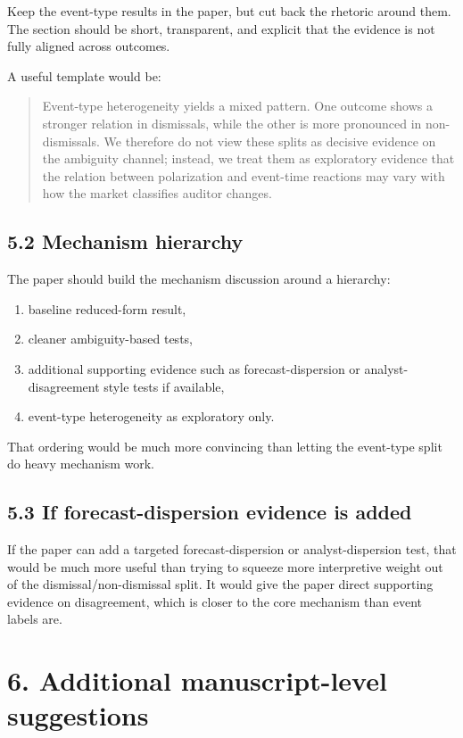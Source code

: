 \documentclass[11pt]{article}
\begin{document}
Keep the event-type results in the paper, but cut back the rhetoric around them. The section should be short, transparent, and explicit that the evidence is not fully aligned across outcomes.

A useful template would be:

\begin{quote}
Event-type heterogeneity yields a mixed pattern. One outcome shows a stronger relation in dismissals, while the other is more pronounced in non-dismissals. We therefore do not view these splits as decisive evidence on the ambiguity channel; instead, we treat them as exploratory evidence that the relation between polarization and event-time reactions may vary with how the market classifies auditor changes.
\end{quote}

\subsection*{5.2 Mechanism hierarchy}

The paper should build the mechanism discussion around a hierarchy:
\begin{enumerate}[leftmargin=1.5em]
    \item baseline reduced-form result,
    \item cleaner ambiguity-based tests,
    \item additional supporting evidence such as forecast-dispersion or analyst-disagreement style tests if available,
    \item event-type heterogeneity as exploratory only.
\end{enumerate}

That ordering would be much more convincing than letting the event-type split do heavy mechanism work.

\subsection*{5.3 If forecast-dispersion evidence is added}

If the paper can add a targeted forecast-dispersion or analyst-dispersion test, that would be much more useful than trying to squeeze more interpretive weight out of the dismissal/non-dismissal split. It would give the paper direct supporting evidence on disagreement, which is closer to the core mechanism than event labels are.

\section*{6. Additional manuscript-level suggestions}
\end{document}
